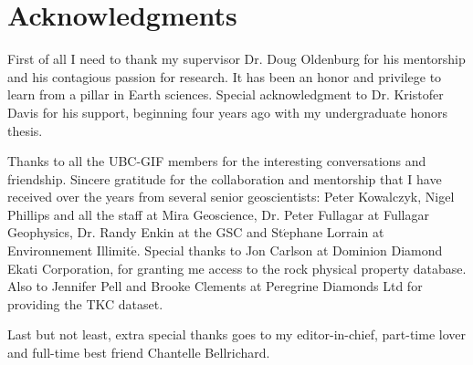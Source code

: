 
\chapter{Acknowledgments}

First of all I need to thank my supervisor Dr. Doug Oldenburg for his mentorship and his contagious passion for research.
It has been an honor and privilege to learn from a pillar in Earth sciences.
Special acknowledgment to Dr. Kristofer Davis for his support, beginning four years ago with my undergraduate honors thesis.

Thanks to all the UBC-GIF members for the interesting conversations and friendship.
Sincere gratitude for the collaboration and mentorship that I have received over the years from several senior geoscientists: Peter Kowalczyk, Nigel Phillips and all the staff at Mira Geoscience, Dr. Peter Fullagar at Fullagar Geophysics, Dr. Randy Enkin at the GSC and St$\acute{\text{e}}$phane Lorrain at Environnement Illimit$\acute{\text{e}}$.
Special thanks to Jon Carlson at Dominion Diamond Ekati Corporation, for granting me access to the rock physical property database.
Also to Jennifer Pell and Brooke Clements at Peregrine Diamonds Ltd for providing the TKC dataset.

Last but not least, extra special thanks goes to my editor-in-chief, part-time lover and full-time best friend Chantelle Bellrichard.


